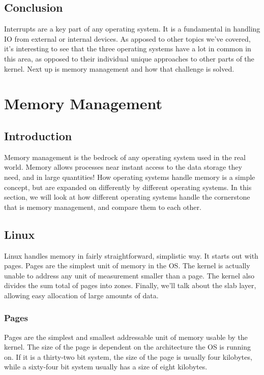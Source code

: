 \documentclass[10pt,letterpaper,onecolumn,draftclsnofoot]{IEEEtran}
\begin{document}
\subsection{Conclusion}

Interrupts are a key part of any operating system. It is a fundamental in handling IO from external or internal devices. As apposed to other topics we've covered, it's
interesting to see that the three operating systems have a lot in common in this
area, as opposed to their individual unique approaches to other parts of the
kernel. Next up is memory management and how that challenge is solved.

\section{Memory Management}
\subsection{Introduction}
Memory management is the bedrock of any operating system used in the real
world. Memory allows processes near instant access to the data storage they
need, and in large quantities! How operating systems handle memory is a simple
concept, but are expanded on differently by different operating systems. In 
this section, we will look at how different operating systems handle the
cornerstone that is memory management, and compare them to each other. 

\subsection{Linux}
Linux handles memory in fairly straightforward, simplistic way. It
starts out with pages. Pages are the simplest unit of memory in the OS.
The kernel is actually unable to address any unit of measurement smaller
than a page. The kernel also divides the sum total of pages into zones.
Finally, we'll talk about the slab layer, allowing easy allocation of
large amounts of data.
\subsubsection{Pages}
Pages are the simplest and smallest addressable unit of memory usable
by the kernel. The size of the page is dependent on the architecture
the OS is running on. If it is a thirty-two bit system, the size of the
page is usually four kilobytes, while a sixty-four bit system usually
has a size of eight kilobytes. \cite{robertlove2010}
\end{document}

